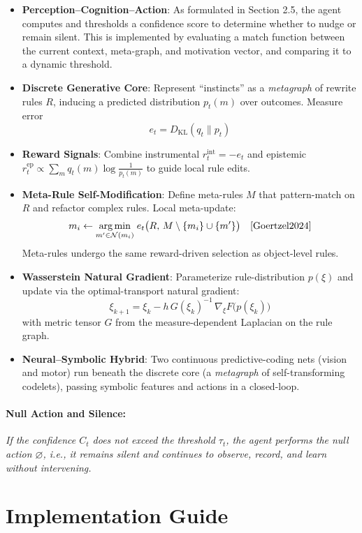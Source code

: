 \documentclass[11pt]{article}
\begin{document}
\begin{itemize}
  \item \textbf{Perception--Cognition--Action}: As formulated in Section 2.5, the agent computes and thresholds a confidence score to determine whether to nudge or remain silent. This is implemented by evaluating a match function between the current context, meta-graph, and motivation vector, and comparing it to a dynamic threshold.
  \item \textbf{Discrete Generative Core}: Represent “instincts” as a \emph{metagraph} of rewrite rules $R$, inducing a predicted distribution $p_t(m)$ over outcomes. Measure error \cite{Goertzel2024}
  \[
    e_t = D_{\mathrm{KL}}(q_t\|p_t)
  \]
  \item \textbf{Reward Signals}: Combine instrumental $r^{\mathrm{int}}_t=-e_t$ and epistemic $r^{\mathrm{ep}}_t\propto\sum_m q_t(m)\log\tfrac1{p_t(m)}$ to guide local rule edits.\cite{Goertzel2024}
  \item \textbf{Meta-Rule Self-Modification}: Define meta-rules $M$ that pattern-match on $R$ and refactor complex rules. Local meta-update:
  \[
    m_i \leftarrow \underset{m'\in\mathcal{N}(m_i)}{\arg\min}\;e_t\bigl(R,\,M\setminus\{m_i\}\cup\{m'\}\bigr)\quad\cite{Goertzel2024}
  \]
  Meta-rules undergo the same reward-driven selection as object-level rules.
  \item \textbf{Wasserstein Natural Gradient}: Parameterize rule-distribution $p(\xi)$ and update via the optimal-transport natural gradient:\cite{Goertzel2024}
  \[
    \xi_{k+1} = \xi_k - h\,G(\xi_k)^{-1}\,\nabla_{\xi}F\bigl(p(\xi_k)\bigr)
  \]
  with metric tensor $G$ from the measure-dependent Laplacian on the rule graph.
  \item \textbf{Neural–Symbolic Hybrid}: Two continuous predictive-coding nets (vision and motor) run beneath the discrete core (a \emph{metagraph} of self-transforming codelets), passing symbolic features and actions in a closed-loop.\cite{Goertzel2024}
\end{itemize}

\paragraph{Null Action and Silence:}
\textit{If the confidence $C_t$ does not exceed the threshold $\tau_t$, the agent performs the null action $\varnothing$, i.e., it remains silent and continues to observe, record, and learn without intervening.}

\section{Implementation Guide}
\end{document}
